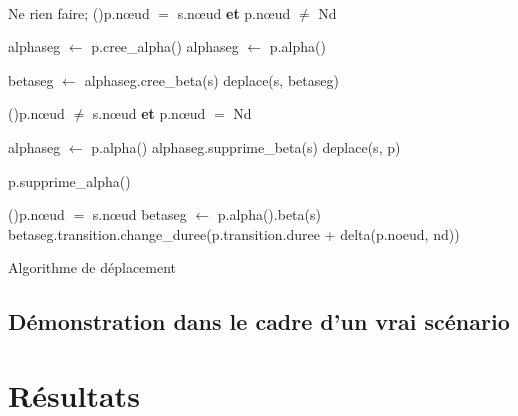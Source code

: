 \begin{algorithm}[H]
	\SetAlgoLined
	
	~ \\
	
	{
		{
			Ne rien faire;	
		}
		\uSinonSi(){p.nœud $=$ s.nœud \textbf{et} p.nœud $\neq$ Nd}
		{
			{
				alphaseg $\longleftarrow$ p.cree\_alpha()\;
			}
			\Sinon
			{
				alphaseg $\longleftarrow$ p.alpha()\;
			}
			
			betaseg $\longleftarrow$ alphaseg.cree\_beta(s)\;
			deplace(s, betaseg)\;
					
		}
		\uSinonSi(){p.nœud $\neq$ s.nœud \textbf{et} p.nœud $=$ Nd}
		{
			alphaseg $\longleftarrow$ p.alpha()\;
			alphaseg.supprime\_beta(s)\;
			deplace(s, p) \;
					
			{
				p.supprime\_alpha()\;
			}		
		}
		\SinonSi(){p.nœud $=$ s.nœud}
		{
			betaseg $\longleftarrow$ p.alpha().beta(s)\;
			betaseg.transition.change\_duree(p.transition.duree + delta(p.noeud, nd))\;
		}	
	}
	
	\caption{Algorithme de déplacement}
	\label{alg.deplacement}
\end{algorithm}
\subsection{Démonstration dans le cadre d'un vrai scénario}
\section{Résultats}